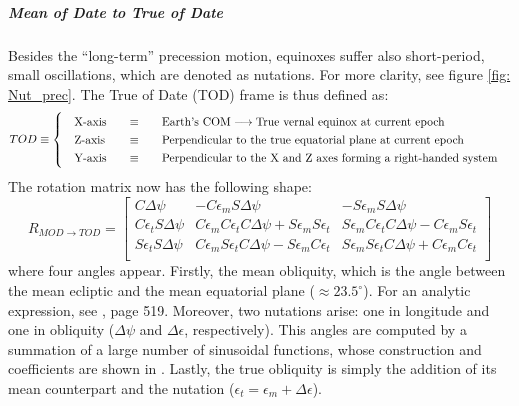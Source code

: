 		\FloatBarrier
		\subparagraph{Mean of Date to True of Date \\}
		\indent Besides the ``long-term'' precession motion, equinoxes suffer also short-period, small oscillations, which are denoted as nutations. For more clarity, see figure \ref{fig:	Nut_prec}. The True of Date (TOD) frame is thus defined as: \\
		\[
		\arraycolsep=10pt
		\def\arraystretch{1.3}
		TOD\equiv\left\{
		\begin{array}{lll}
		\text{X-axis} 	& \equiv 	& \text{Earth's COM} \longrightarrow \text{True vernal equinox at current epoch} \\
		\text{Z-axis} 	& \equiv 	& \text{Perpendicular to the true equatorial plane at current epoch} \\
		\text{Y-axis} 	& \equiv 	& \text{Perpendicular to the X and Z axes forming a right-handed system} \\
		\end{array}
		\right.
		\]
		\indent The rotation matrix now has the following shape:
		\begin{equation}
		R_{MOD\rightarrow TOD} = 
		\left[ 
		\begin{array}{ccc}
		C \Delta \psi 				& - C \epsilon_m S \Delta \psi 	& - S \epsilon_m S \Delta \psi \\
		C \epsilon_t S \Delta \psi 	& C \epsilon_m C \epsilon_t C \Delta \psi + S \epsilon_m S \epsilon_t & S \epsilon_m C \epsilon_t C \Delta \psi - C \epsilon_m S \epsilon_t \\
		S \epsilon_t S \Delta \psi 	& C \epsilon_m S \epsilon_t C \Delta \psi - S \epsilon_m C \epsilon_t & S \epsilon_m S \epsilon_t C \Delta \psi + C \epsilon_m C \epsilon_t \\
		\end{array}
		\right]
		\label{eq: R_MOD_TOD}
		\end{equation}
		\noindent where four angles appear. Firstly, the mean obliquity, which is the angle between the mean ecliptic and the mean equatorial plane ($\approx 23.5^{\circ}$). For an analytic expression, see \cite{Tapley}, page 519. Moreover, two nutations arise: one in longitude and one in obliquity ($\Delta \psi$ and $\Delta \epsilon$, respectively). This angles are computed by a summation of a large number of sinusoidal functions, whose construction and coefficients are shown in \cite{IERS_conventions}. Lastly, the true obliquity is simply the addition of its mean counterpart and the nutation ($\epsilon_t = \epsilon_m + \Delta \epsilon$).
